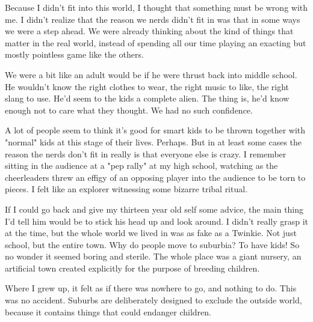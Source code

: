 Because I didn't fit into this world, I
                  thought that something must be wrong with me. I didn't realize
                  that the reason we nerds didn't fit in was that in some ways
                  we were a step ahead. We were already thinking about the kind
                  of things that matter in the real world, instead of spending
                  all our time playing an exacting but mostly pointless game
                  like the others.

We were a bit like an adult would
                  be if he were thrust back into middle school. He wouldn't know
                  the right clothes to wear, the right music to like, the right
                  slang to use. He'd seem to the kids a complete alien. The
                  thing is, he'd know enough not to care what they thought. We
                  had no such confidence.

A lot of people seem to
                  think it's good for smart kids to be thrown together with
                  "normal" kids at this stage of their lives. Perhaps. But in at
                  least some cases the reason the nerds don't fit in really is
                  that everyone else is crazy. I remember sitting in the
                  audience at a "pep rally" at my high school, watching as the
                  cheerleaders threw an effigy of an opposing player into the
                  audience to be torn to pieces. I felt like an explorer
                  witnessing some bizarre tribal ritual.




                  If I could go back and give my thirteen year old self some
                  advice, the main thing I'd tell him would be to stick his head
                  up and look around. I didn't really grasp it at the time, but
                  the whole world we lived in was as fake as a Twinkie. Not just
                  school, but the entire town. Why do people move to suburbia?
                  To have kids! So no wonder it seemed boring and sterile. The
                  whole place was a giant nursery, an artificial town created
                  explicitly for the purpose of breeding children.

Where
                  I grew up, it felt as if there was nowhere to go, and nothing
                  to do. This was no accident. Suburbs are deliberately designed
                  to exclude the outside world, because it contains things that
                  could endanger children.


